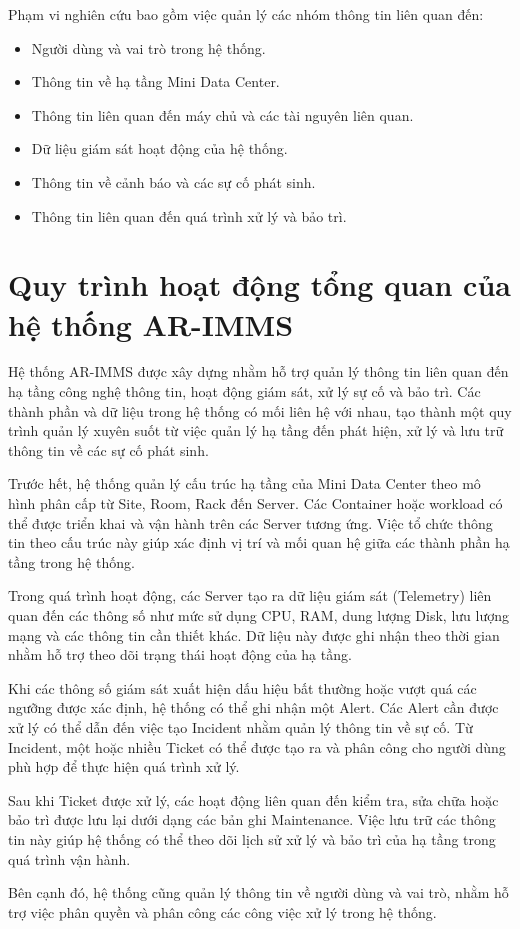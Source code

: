 Phạm vi nghiên cứu bao gồm việc quản lý các nhóm thông tin liên quan đến:
\begin{itemize}[leftmargin=*]
    \item Người dùng và vai trò trong hệ thống.
    \item Thông tin về hạ tầng Mini Data Center.
    \item Thông tin liên quan đến máy chủ và các tài nguyên liên quan.
    \item Dữ liệu giám sát hoạt động của hệ thống.
    \item Thông tin về cảnh báo và các sự cố phát sinh.
    \item Thông tin liên quan đến quá trình xử lý và bảo trì.
\end{itemize}

\section{Quy trình hoạt động tổng quan của hệ thống AR-IMMS}
Hệ thống AR-IMMS được xây dựng nhằm hỗ trợ quản lý thông tin liên quan đến hạ tầng công nghệ thông tin, hoạt động giám sát, xử lý sự cố và bảo trì. Các thành phần và dữ liệu trong hệ thống có mối liên hệ với nhau, tạo thành một quy trình quản lý xuyên suốt từ việc quản lý hạ tầng đến phát hiện, xử lý và lưu trữ thông tin về các sự cố phát sinh.

Trước hết, hệ thống quản lý cấu trúc hạ tầng của Mini Data Center theo mô hình phân cấp từ Site, Room, Rack đến Server. Các Container hoặc workload có thể được triển khai và vận hành trên các Server tương ứng. Việc tổ chức thông tin theo cấu trúc này giúp xác định vị trí và mối quan hệ giữa các thành phần hạ tầng trong hệ thống.

Trong quá trình hoạt động, các Server tạo ra dữ liệu giám sát (Telemetry) liên quan đến các thông số như mức sử dụng CPU, RAM, dung lượng Disk, lưu lượng mạng và các thông tin cần thiết khác. Dữ liệu này được ghi nhận theo thời gian nhằm hỗ trợ theo dõi trạng thái hoạt động của hạ tầng.

Khi các thông số giám sát xuất hiện dấu hiệu bất thường hoặc vượt quá các ngưỡng được xác định, hệ thống có thể ghi nhận một Alert. Các Alert cần được xử lý có thể dẫn đến việc tạo Incident nhằm quản lý thông tin về sự cố. Từ Incident, một hoặc nhiều Ticket có thể được tạo ra và phân công cho người dùng phù hợp để thực hiện quá trình xử lý.

Sau khi Ticket được xử lý, các hoạt động liên quan đến kiểm tra, sửa chữa hoặc bảo trì được lưu lại dưới dạng các bản ghi Maintenance. Việc lưu trữ các thông tin này giúp hệ thống có thể theo dõi lịch sử xử lý và bảo trì của hạ tầng trong quá trình vận hành.

Bên cạnh đó, hệ thống cũng quản lý thông tin về người dùng và vai trò, nhằm hỗ trợ việc phân quyền và phân công các công việc xử lý trong hệ thống.
